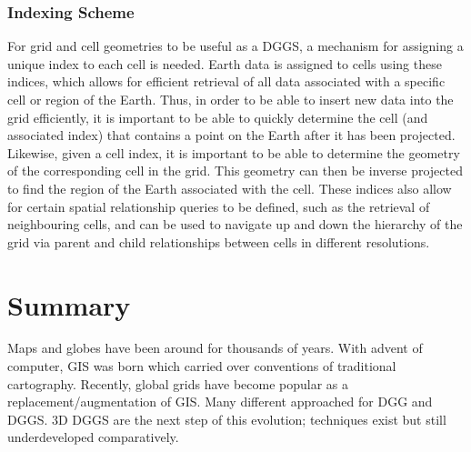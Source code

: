 \subsubsection{Indexing Scheme} \label{sec::dggs:indexing}
For grid and cell geometries to be useful as a DGGS, a mechanism for assigning a unique index to each cell is needed.
Earth data is assigned to cells using these indices, which allows for efficient retrieval of all data associated with a specific cell or region of the Earth.
Thus, in order to be able to insert new data into the grid efficiently, it is important to be able to quickly determine the cell (and associated index) that contains a point on the Earth after it has been projected.
Likewise, given a cell index, it is important to be able to determine the geometry of the corresponding cell in the grid.
This geometry can then be inverse projected to find the region of the Earth associated with the cell.
These indices also allow for certain spatial relationship queries to be defined, such as the retrieval of neighbouring cells, and can be used to navigate up and down the hierarchy of the grid via parent and child relationships between cells in different resolutions.


\section{Summary}
Maps and globes have been around for thousands of years.
With advent of computer, GIS was born which carried over conventions of traditional cartography.
Recently, global grids have become popular as a replacement/augmentation of GIS.
Many different approached for DGG and DGGS.
3D DGGS are the next step of this evolution; techniques exist but still underdeveloped comparatively.
